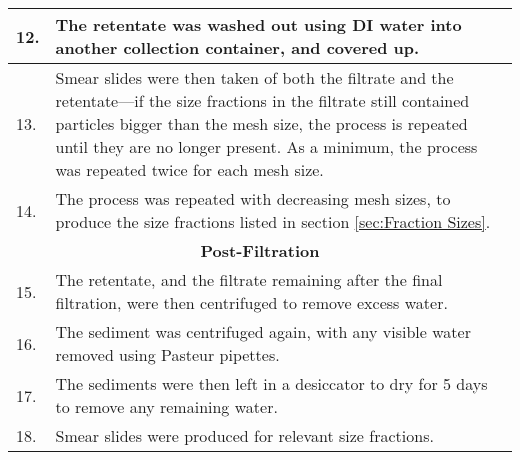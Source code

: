\documentclass[12pt]{article}\usepackage[]{graphicx}\usepackage[]{color}
\begin{document}
\begin{longtable}{|p{1cm}|p{14cm}|}
\\ \hline
12. & The retentate was washed out using DI water into another collection container, and covered up. 
\\ \hline
13. & Smear slides were then taken of both the filtrate and the retentate---if the size fractions in the filtrate still contained particles bigger than the mesh size, the process is repeated until they are no longer present. As a minimum, the process was repeated twice for each mesh size. 
\\ \hline
14. & The process was repeated with decreasing mesh sizes, to produce the size fractions listed in section \ref{sec:Fraction Sizes}. 
\\ \hline
\multicolumn{2}{c}{\textbf{Post-Filtration}} 
\\ \hline
15. & The retentate, and the filtrate remaining after the final filtration, were then centrifuged to remove excess water. 
\\ \hline
16. & The sediment was centrifuged again, with any visible water removed using Pasteur pipettes. 
\\ \hline
17. & The sediments were then left in a desiccator to dry for 5 days to remove any remaining water. 
\\ \hline
18. & Smear slides were produced for relevant size fractions. 
\\ \hline
\end{longtable}
\end{document}
